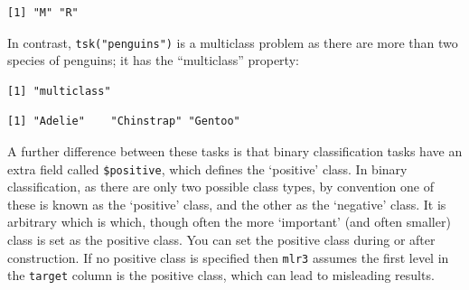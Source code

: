 \begin{verbatim}
[1] "M" "R"
\end{verbatim}

In contrast, \texttt{tsk("penguins")} is a multiclass problem as there
are more than two species of penguins; it has the ``multiclass''
property:

\begin{Shaded}
\begin{Highlighting}[]
\OtherTok{=} \NormalTok{(}\NormalTok{)}
\SpecialCharTok{$}
\end{Highlighting}
\end{Shaded}

\begin{verbatim}
[1] "multiclass"
\end{verbatim}

\begin{Shaded}
\begin{Highlighting}[]
\SpecialCharTok{$}
\end{Highlighting}
\end{Shaded}

\begin{verbatim}
[1] "Adelie"    "Chinstrap" "Gentoo"   
\end{verbatim}

A further difference between these tasks is that binary classification
tasks have an extra field called
\texttt{\$positive},
which defines the `positive' class. In binary classification, as there
are only two possible class types, by convention one of these is known
as the `positive' class, and the other as the `negative' class. It is
arbitrary which is which, though often the more `important' (and often
smaller) class is set as the positive class. You can set the positive
class during or after construction. If no positive class is specified
then \texttt{mlr3} assumes the first level in the \texttt{target} column
is the positive class, which can lead to misleading results.

\begin{Shaded}
\begin{Highlighting}[]
 \NormalTok{)}
\OtherTok{=}  \NormalTok{, } \NormalTok{)}
\SpecialCharTok{$}
\end{Highlighting}
\end{Shaded}

